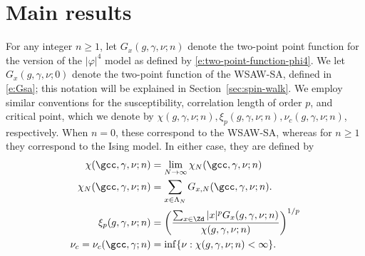 \section{Main results}
\label{sec:mr}

For any integer $n \ge 1$, let $G_x(g, \gamma, \nu; n)$
denote the two-point point function for the version of the $|\varphi|^4$ model
as defined by \eqref{e:two-point-function-phi4}.
We let $G_x(g, \gamma, \nu; 0)$ denote the two-point function of the WSAW-SA,
defined in \eqref{e:Gsa}; this notation will be explained in Section~\ref{sec:spin-walk}.
We employ similar conventions for the susceptibility, correlation length of order $p$,
and critical point, which we denote by
$\chi(g, \gamma, \nu; n), \xi_p(g, \gamma, \nu; n), \nu_c(g, \gamma, \nu; n)$, respectively.
When $n = 0$, these correspond to the WSAW-SA, whereas for $n \ge 1$ they correspond to the
Ising model. In either case, they are defined by
\begin{align}
\label{e:chilim}
\chi(\gcc, \gamma, \nu; n)
	&= \lim_{N\to\infty} \chi_N(\gcc, \gamma, \nu; n) \\
\label{e:chiNdef}
\chi_N(\gcc, \gamma, \nu; n)
	&= \sum_{x\in\Lambda_N} G_{x,N}(\gcc, \gamma, \nu; n). \\
\label{e:clp}
\xi_p(g, \gamma, \nu; n)
	&= \left(\frac{\sum_{x\in\Zd} |x|^p G_x(g, \gamma, \nu; n)}{\chi(g, \gamma, \nu; n)}\right)^{1/p} \\
\label{e:nuc-def}
\nu_c
	= \nu_c(\gcc, \gamma; n) &= \inf \{ \nu : \chi(g, \gamma, \nu; n) < \infty \}.
\end{align}

